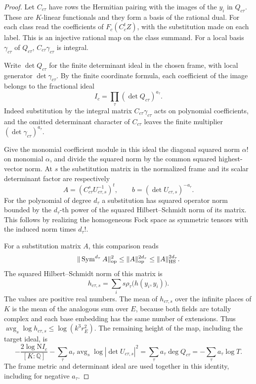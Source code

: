 \begin{proof}
Let \(C_{c\tau}\) have rows the Hermitian pairing with the
images of the \(y_i\) in \(Q_{c\tau}\).
These are \(K\)-linear functionals and they form a basis
of the rational dual. For each class read the coefficients of
\(F_c(C_c^tZ)\), with the substitution made on each label.
This is an injective rational map on the class summand.
For a local basis \(\gamma_{c\tau}\) of \(Q_{c\tau}\),
\(C_{c\tau}\gamma_{c\tau}\) is integral.

Write
\(\det Q_{c\tau}\) for the finite determinant ideal in the
chosen frame, with local generator \(\det\gamma_{c\tau}\).
By the finite
coordinate formula, each coefficient of the image belongs to
the fractional ideal
\[
             I_c=\prod_\tau(\det Q_{c\tau})^{a_\tau}.
\]
Indeed substitution by the integral
matrix \(C_{c\tau}\gamma_{c\tau}\) acts on polynomial
coefficients, and the omitted determinant character of
\(C_{c\tau}\) leaves the finite multiplier
\((\det\gamma_{c\tau})^{a_\tau}\).

Give the monomial coefficient module in this ideal the
diagonal squared norm \(\alpha!\) on monomial \(\alpha\),
and divide the squared norm by the common squared
highest-vector norm.
At \(s\) the substitution matrix in the normalized frame and its scalar determinant factor are respectively
\[
  A=(C_{c\tau}^sU_{c\tau,s}^{-1})^t,\qquad b=(\det U_{c\tau,s})^{-a_\tau}.
\]
For the polynomial of degree \(d_\tau\) a substitution has
squared operator norm bounded by the \(d_\tau\)-th power of
the squared Hilbert--Schmidt norm of its matrix. This follows
by realizing the homogeneous Fock space as symmetric tensors
with the induced norm times \(d_\tau!\).

For a substitution matrix \(A\), this comparison reads
\[
  \|\operatorname{Sym}^{d_\tau} A\|_{\rm op}^2\le\|A\|_{\rm op}^{2d_\tau}\le\|A\|_{\rm HS}^{2d_\tau}.
\]
 The squared
Hilbert--Schmidt norm of this matrix is
\[
 h_{c\tau,s}=\sum_i s\rho_\tau\bigl(h(y_i,y_i)\bigr).
\]
The values are positive real numbers. The mean of
\(h_{c\tau,s}\) over the infinite places of \(K\) is the
mean of the analogous sum over \(E\), because both fields
are totally complex and each base embedding has the same
number of extensions. Thus
\(\operatorname{avg}_s\log h_{c\tau,s}\le\log(k^3r_E^2)\).
The remaining height of the map, including the target ideal, is
\[
 -\frac{2\log\mathrm N I_c}{[K:\mathbb Q]}
    -\sum_\tau a_\tau\operatorname{avg}_s\log|\det U_{c\tau,s}|^2
 =\sum_\tau a_\tau\deg Q_{c\tau}
 =-\sum_\tau a_\tau\log T .
\]
The frame metric and determinant ideal are used together in this
identity, including for negative \(a_\tau\).


\end{proof}
